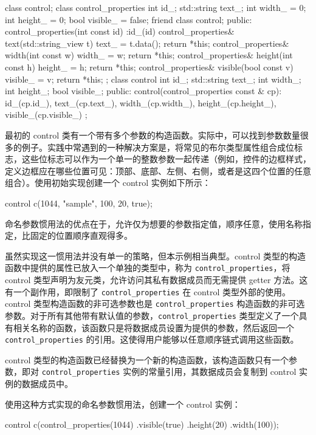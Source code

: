 \begin{cpp}
class control;
class control_properties
{
    int id_;
    std::string text_;
    int width_ = 0;
    int height_ = 0;
    bool visible_ = false;
    friend class control;
public:
    control_properties(int const id) :id_(id)
    {}
    control_properties& text(std::string_view t)
    { text_ = t.data(); return *this; }
    control_properties& width(int const w)
    { width_ = w; return *this; }
    control_properties& height(int const h)
    { height_ = h; return *this; }
    control_properties& visible(bool const v)
    { visible_ = v; return *this; }
};
class control
{
    int         id_;
    std::string text_;
    int         width_;
    int         height_;
    bool        visible_;
    public:
    control(control_properties const & cp):
        id_(cp.id_),
        text_(cp.text_),
        width_(cp.width_),
        height_(cp.height_),
        visible_(cp.visible_)
    {}
};
\end{cpp}


最初的 control 类有一个带有多个参数的构造函数。实际中，可以找到参数数量很多的例子。实践中常遇到的一种解决方案是，将常见的布尔类型属性组合成位标志，这些位标志可以作为一个单一的整数参数一起传递（例如，控件的边框样式，定义边框应在哪些位置可见：顶部、底部、左侧、右侧，或者是这四个位置的任意组合）。使用初始实现创建一个 control 实例如下所示：

\begin{cpp}
control c(1044, "sample", 100, 20, true);
\end{cpp}

命名参数惯用法的优点在于，允许仅为想要的参数指定值，顺序任意，使用名称指定，比固定的位置顺序直观得多。

虽然实现这一惯用法并没有单一的策略，但本示例相当典型。control 类型的构造函数中提供的属性已放入一个单独的类型中，称为 \verb|control_properties|，将 control 类型声明为友元类，允许访问其私有数据成员而无需提供 getter 方法。这有一个副作用，即限制了 \verb|control_properties| 在 control 类型外部的使用。control 类型构造函数的非可选参数也是 \verb|control_properties| 构造函数的非可选参数。对于所有其他带有默认值的参数，\verb|control_properties| 类型定义了一个具有相关名称的函数，该函数只是将数据成员设置为提供的参数，然后返回一个 \verb|control_properties| 的引用。这使得用户能够以任意顺序链式调用这些函数。

control 类型的构造函数已经替换为一个新的构造函数，该构造函数只有一个参数，即对 \verb|control_properties| 实例的常量引用，其数据成员会复制到 control 实例的数据成员中。

使用这种方式实现的命名参数惯用法，创建一个 control 实例：

\begin{cpp}
control c(control_properties(1044)
        .visible(true)
        .height(20)
        .width(100));
\end{cpp}


